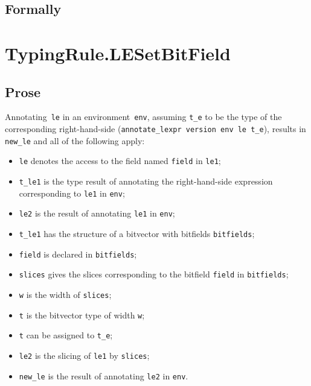 \documentclass{book}
\begin{document}
\begin{emptyformal}
    \subsection{Formally}
\end{emptyformal}


\section{TypingRule.LESetBitField \label{sec:TypingRule.LESetBitField}}

    \subsection{Prose}
   Annotating~\texttt{le} in an environment~\texttt{env}, assuming
\texttt{t\_e} to be the type of the corresponding right-hand-side
(\texttt{annotate\_lexpr version env le t\_e}), results in \texttt{new\_le} and
all of the following apply:
   \begin{itemize}
   \item \texttt{le} denotes the access to the field named \texttt{field} in \texttt{le1};
   \item \texttt{t\_le1} is the type result of annotating the right-hand-side expression corresponding to \texttt{le1} in \texttt{env};
   \item \texttt{le2} is the result of annotating \texttt{le1} in \texttt{env};
   \item \texttt{t\_le1} has the structure of a bitvector with bitfields \texttt{bitfields};
   \item \texttt{field} is declared in \texttt{bitfields};
   \item \texttt{slices} gives the slices corresponding to the bitfield \texttt{field} in
      \texttt{bitfields};
   \item \texttt{w} is the width of \texttt{slices};
   \item \texttt{t} is the bitvector type of width \texttt{w};
   \item \texttt{t} can be assigned to \texttt{t\_e};
   \item \texttt{le2} is the slicing of \texttt{le1} by \texttt{slices};
   \item \texttt{new\_le} is the result of annotating \texttt{le2} in \texttt{env}.
   \end{itemize}
\end{document}
